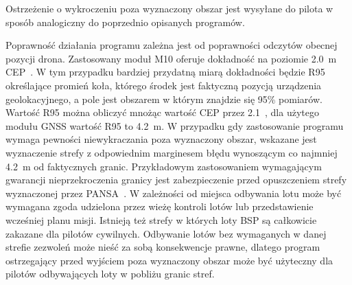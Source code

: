 \documentclass[a4paper,12pt]{book}
\begin{document}
        Ostrzeżenie o wykroczeniu poza wyznaczony obszar jest wysyłane do pilota w sposób analogiczny do poprzednio opisanych programów.\par
        Poprawność działania programu zależna jest od poprawności odczytów obecnej pozycji drona. Zastosowany moduł M10 oferuje dokładność na poziomie 2.0~m CEP~\cite{web:holybro:m10gps}. W tym przypadku bardziej przydatną 
        miarą dokładności będzie R95 określające promień koła, którego środek jest faktyczną pozycją urządzenia geolokacyjnego, a pole jest obszarem w którym znajdzie się 95\% pomiarów. Wartość R95 można obliczyć mnożąc wartość CEP przez 
        2.1~\cite[Table 2]{web:novatel:position:accuracy:measures}, dla użytego modułu GNSS wartość R95 to 4.2~m. W przypadku gdy zastosowanie programu wymaga pewności niewykraczania poza wyznaczony obszar, wskazane jest wyznaczenie strefy 
        z odpowiednim marginesem błędu wynoszącym co najmniej 4.2~m od faktycznych granic. Przykładowym zastosowaniem wymagającym gwarancji nieprzekroczenia granicy jest zabezpieczenie przed opuszczeniem strefy wyznaczonej przez PANSA~\cite{web:pansa:map}. 
        W zależności od miejsca odbywania lotu może być wymagana zgoda udzielona przez wieżę kontroli lotów lub przedstawienie wcześniej planu misji. Istnieją też strefy w których loty BSP są całkowicie zakazane dla pilotów cywilnych. 
        Odbywanie lotów bez wymaganych w danej strefie zezwoleń może nieść za sobą konsekwencje prawne, dlatego program ostrzegający przed wyjściem poza wyznaczony obszar może być użyteczny dla pilotów odbywających loty w pobliżu granic stref.
\end{document}
